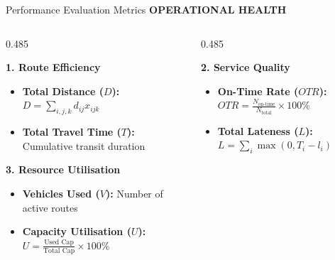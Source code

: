 \documentclass[aspectratio=169,10pt]{beamer}
\newcommand{\sectiontag}[1]{%
    {\scriptsize\bfseries\color{Accent}\MakeUppercase{#1}}\par\vspace{0.08cm}
}
\begin{document}
\begin{frame}{Performance Evaluation Metrics}
\sectiontag{Operational Health}


\vspace{-0.15cm}

\begin{columns}[T,totalwidth=\textwidth]

    \begin{column}{0.485\textwidth}

        {\bfseries\color{Primary}\small 1. Route Efficiency}
        \par\vspace{0.04cm}
        \begin{itemize}
            \setlength{\itemsep}{3pt}
            \scriptsize
            \item \textbf{Total Distance ($D$):} $D = \sum_{i,j,k} d_{ij}x_{ijk}$
            \item \textbf{Total Travel Time ($T$):} Cumulative transit duration
        \end{itemize}

        \vspace{0.22cm}

        {\bfseries\color{Primary}\small 3. Resource Utilisation}
        \par\vspace{0.04cm}
        \begin{itemize}
            \setlength{\itemsep}{3pt}
            \scriptsize
            \item \textbf{Vehicles Used ($V$):} Number of active routes
            \item \textbf{Capacity Utilisation ($U$):} $U = \frac{\text{Used Cap}}{\text{Total Cap}} \times 100\%$
        \end{itemize}

    \end{column}

    \begin{column}{0.485\textwidth}

        {\bfseries\color{Primary}\small 2. Service Quality}
        \par\vspace{0.04cm}
        \begin{itemize}
            \setlength{\itemsep}{3pt}
            \scriptsize
            \item \textbf{On-Time Rate ($OTR$):} $OTR = \frac{N_{\text{on-time}}}{N_{\text{total}}} \times 100\%$
            \item \textbf{Total Lateness ($L$):} $L = \sum_i \max(0, T_i - l_i)$
        \end{itemize}


\end{column}
\end{columns}
\end{frame}
\end{document}
